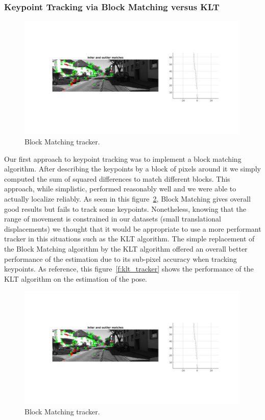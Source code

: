 \subsubsection{Keypoint Tracking via Block Matching versus KLT}
\begin{figure}
  \includegraphics[width=0.99\textwidth]{files/block_tracker.jpg}
  \caption[\label{f:block_tracker} Block Matching tracker]{Block Matching tracker.}
\end{figure}
Our first approach to keypoint tracking was to implement a block matching algorithm. After describing the keypoints by a block of pixels around it
we simply computed the sum of squared differences to match different blocks. This approach, while simplistic, performed reasonably well and we
were able to actually localize reliably. As seen in this figure~\ref{f:block_tracker}, Block Matching gives overall good results but fails to
track some keypoints.
Nonetheless, knowing that the range of movement is constrained in our datasets (small translational displacements) we thought that it would be appropriate to use a more performant tracker in this situations such as the KLT algorithm.
The simple replacement of the Block Matching algorithm by the KLT algorithm offered an overall better performance of the estimation due to its sub-pixel accuracy when tracking keypoints. As reference, this figure~\ref{f:klt_tracker} shows the performance of the KLT algorithm on the estimation of the pose.
\begin{figure}
  \includegraphics[width=0.99\textwidth]{files/block_tracker.jpg}
  \caption[\label{f:block_tracker} Block Matching tracker]{Block Matching tracker.}
\end{figure}

